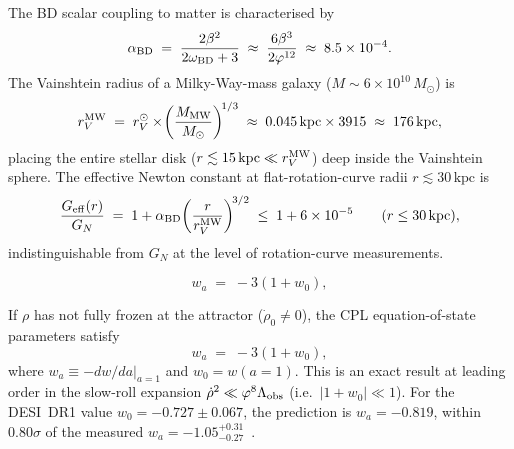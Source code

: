 \begin{proposition}
\label{P7:prop:Geff}
The BD scalar coupling to matter is characterised by
\begin{equation}
  \alpha_{\rm BD}
  \;=\; \frac{2\beta^2}{2\omega_{\rm BD}+3}
  \;\approx\; \frac{6\beta^3}{2\varphi^{12}}
  \;\approx\; 8.5\times10^{-4}.
  \label{P7:eq:alpha_BD}
\end{equation}
The Vainshtein radius of a Milky-Way-mass galaxy
($M\sim6\times10^{10}\,M_\odot$) is
\begin{equation}
  r_V^{\rm MW}
  \;=\; r_V^\odot\times\!\left(\frac{M_{\rm MW}}{M_\odot}\right)^{\!1/3}
  \;\approx\; 0.045\,\mathrm{kpc}\times3915
  \;\approx\; 176\,\mathrm{kpc},
  \label{P7:eq:rV_MW}
\end{equation}
placing the entire stellar disk ($r\lesssim15\,\mathrm{kpc}\ll r_V^{\rm MW}$)
deep inside the Vainshtein sphere.
The effective Newton constant at flat-rotation-curve radii $r\lesssim30\,\mathrm{kpc}$
is
\begin{equation}
  \frac{G_{\rm eff}(r)}{G_N}
  \;=\; 1 + \alpha_{\rm BD}\!\left(\frac{r}{r_V^{\rm MW}}\right)^{\!3/2}
  \;\leq\; 1 + 6\times10^{-5}
  \qquad(r\leq30\,\mathrm{kpc}),
  \label{P7:eq:Geff_screened}
\end{equation}
indistinguishable from $G_N$ at the level of rotation-curve measurements.
\end{proposition}

\begin{equation}
  \boxed{w_a \;=\; -3(1+w_0),}
  \label{P7:eq:wa_derived}
\end{equation}

\begin{theorem}
\label{P7:thm:thawing}
If $\rho$ has not fully frozen at the attractor ($\dot\rho_0\neq0$),
the CPL equation-of-state parameters satisfy
\begin{equation}
  \boxed{w_a \;=\; -3(1+w_0),}
  \label{P7:eq:thawing}
\end{equation}
where $w_a\equiv-dw/da\big|_{a=1}$ and $w_0=w(a=1)$.
This is an exact result at leading order in the slow-roll expansion
$\dot\rho^2\ll\varphi^8\Lambda_{\mathrm{obs}}$ (i.e.\ $|1+w_0|\ll1$).
For the DESI~DR1 value $w_0=-0.727\pm0.067$, the prediction is
$w_a=-0.819$, within $0.80\sigma$ of the measured
$w_a=-1.05^{+0.31}_{-0.27}$~\cite{DESI2024}.
\end{theorem}

